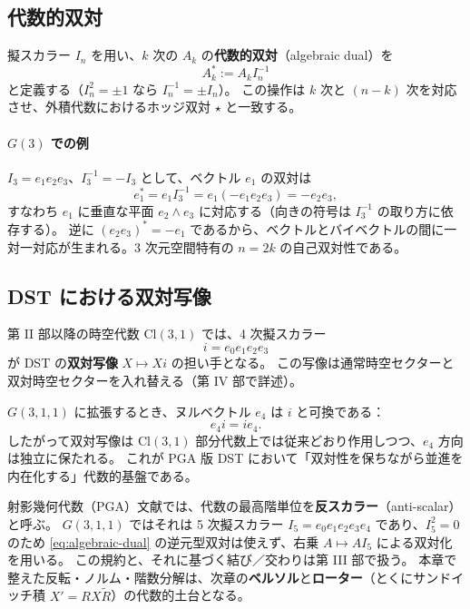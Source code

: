 \documentclass[dvipdfmx,a4paper,oneside]{jsbook}
\numberwithin{equation}{chapter}
\begin{document}
\subsection{代数的双対}

擬スカラー \(I_n\) を用い、\(k\) 次の \(A_k\) の\textbf{代数的双対}（algebraic dual）を
\begin{equation}
  A_k^* := A_k I_n^{-1}
  \label{eq:algebraic-dual}
\end{equation}
と定義する（\(I_n^2 = \pm 1\) なら \(I_n^{-1} = \pm I_n\)）。
この操作は \(k\) 次と \((n-k)\) 次を対応させ、外積代数におけるホッジ双対 \(\star\) と一致する。

\paragraph{\(G(3)\) での例}
\(I_3 = e_1 e_2 e_3\)、\(I_3^{-1} = -I_3\) として、ベクトル \(e_1\) の双対は
\begin{equation}
  e_1^* = e_1 I_3^{-1} = e_1(-e_1 e_2 e_3) = -e_2 e_3,
\end{equation}
すなわち \(e_1\) に垂直な平面 \(e_2\wedge e_3\) に対応する（向きの符号は \(I_3^{-1}\) の取り方に依存する）。
逆に \((e_2 e_3)^* = -e_1\) であるから、ベクトルとバイベクトルの間に一対一対応が生まれる。3 次元空間特有の \(n=2k\) の自己双対性である。

\subsection{DST における双対写像}

第 II 部以降の時空代数 \(\mathrm{Cl}(3,1)\) では、4 次擬スカラー
\begin{equation}
  i = e_0 e_1 e_2 e_3
  \label{eq:dst-pseudoscalar}
\end{equation}
が DST の\textbf{双対写像} \(X \mapsto Xi\) の担い手となる。
この写像は通常時空セクターと双対時空セクターを入れ替える（第 IV 部で詳述）。

\(G(3,1,1)\) に拡張するとき、ヌルベクトル \(e_4\) は \(i\) と可換である：
\begin{equation}
  e_4 i = i e_4.
  \label{eq:e4-i-commute}
\end{equation}
したがって双対写像は \(\mathrm{Cl}(3,1)\) 部分代数上では従来どおり作用しつつ、\(e_4\) 方向は独立に保たれる。
これが PGA 版 DST において「双対性を保ちながら並進を内在化する」代数的基盤である。

射影幾何代数（PGA）文献では、代数の最高階単位を\textbf{反スカラー}（anti-scalar）と呼ぶ。
\(G(3,1,1)\) ではそれは 5 次擬スカラー \(I_5 = e_0 e_1 e_2 e_3 e_4\) であり、\(I_5^2 = 0\) のため \eqref{eq:algebraic-dual} の逆元型双対は使えず、右乗 \(A \mapsto A I_5\) による双対化を用いる。
この規約と、それに基づく結び／交わりは第 III 部で扱う。
本章で整えた反転・ノルム・階数分解は、次章の\textbf{ベルソル}と\textbf{ローター}（とくにサンドイッチ積 \(X' = RX\widetilde{R}\)）の代数的土台となる。
\end{document}
